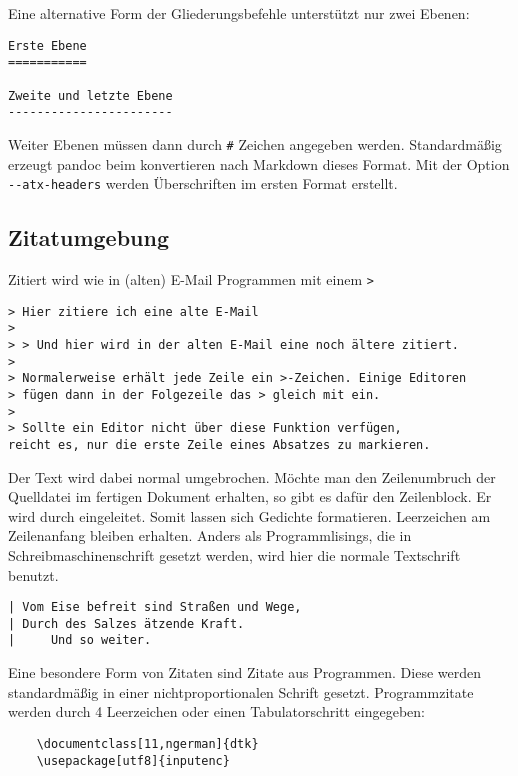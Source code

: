 \documentclass[11pt,ngerman,a4paper]{article}
\begin{document}
Eine alternative Form der Gliederungsbefehle unterstützt nur zwei
Ebenen:

\begin{verbatim}
Erste Ebene
===========

Zweite und letzte Ebene
-----------------------
\end{verbatim}

Weiter Ebenen müssen dann durch \texttt{\#} Zeichen angegeben werden.
Standardmäßig erzeugt pandoc beim konvertieren nach Markdown dieses
Format. Mit der Option \texttt{-{}-atx-headers} werden Überschriften im
ersten Format erstellt.

\subsection{Zitatumgebung}\label{zitatumgebung}

Zitiert wird wie in (alten) E-Mail Programmen mit einem
\texttt{\textgreater{}}

\begin{verbatim}
> Hier zitiere ich eine alte E-Mail
>
> > Und hier wird in der alten E-Mail eine noch ältere zitiert.
>
> Normalerweise erhält jede Zeile ein >-Zeichen. Einige Editoren
> fügen dann in der Folgezeile das > gleich mit ein.
>
> Sollte ein Editor nicht über diese Funktion verfügen,
reicht es, nur die erste Zeile eines Absatzes zu markieren.
\end{verbatim}

Der Text wird dabei normal umgebrochen. Möchte man den Zeilenumbruch der
Quelldatei im fertigen Dokument erhalten, so gibt es dafür den
Zeilenblock. Er wird durch \texttt{\textbar{}} eingeleitet. Somit lassen
sich Gedichte formatieren. Leerzeichen am Zeilenanfang bleiben erhalten.
Anders als Programmlisings, die in Schreibmaschinenschrift gesetzt
werden, wird hier die normale Textschrift benutzt.

\begin{verbatim}
| Vom Eise befreit sind Straßen und Wege,
| Durch des Salzes ätzende Kraft.
|     Und so weiter.
\end{verbatim}

Eine besondere Form von Zitaten sind Zitate aus Programmen. Diese werden
standardmäßig in einer nichtproportionalen Schrift gesetzt.
Programmzitate werden durch 4 Leerzeichen oder einen Tabulatorschritt
eingegeben:

\begin{verbatim}
    \documentclass[11,ngerman]{dtk}
    \usepackage[utf8]{inputenc}
\end{verbatim}
\end{document}
